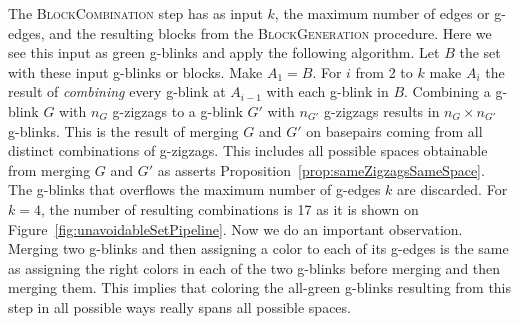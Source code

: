 The \textsc{BlockCombination} step has as input $k$, the maximum number
of edges or g-edges, and the resulting blocks from the \textsc{BlockGeneration}
procedure. Here we see this input as green g-blinks and apply the
following algorithm. Let $B$ the set with these
input g-blinks or blocks. Make $A_1 = B$. For $i$ from 2 to $k$ make
$A_i$ the result of {\em combining} every g-blink at $A_{i-1}$ with each
g-blink in $B$. Combining a g-blink $G$ with $n_G$ g-zigzags to a
g-blink $G'$ with $n_{G'}$ g-zigzags results in $n_G \times n_{G'}$
g-blinks. This is the result of merging $G$ and $G'$ on
basepairs coming from all distinct combinations of g-zigzags. This
includes all possible spaces obtainable from merging $G$ and $G'$
as asserts Proposition~\ref{prop:sameZigzagsSameSpace}. The g-blinks
that overflows the maximum number of g-edges $k$ are discarded. For $k=4$,
the number of resulting combinations is 17 as it is shown on
Figure~\ref{fig:unavoidableSetPipeline}. Now we do an important
observation. Merging two g-blinks and then assigning a color to
each of its g-edges is the same as assigning the right colors in each
of the two g-blinks before merging and then merging them. This implies
that coloring the all-green g-blinks resulting from this step in all
possible ways really spans all possible spaces.

